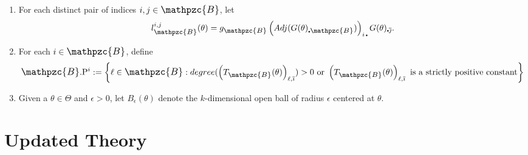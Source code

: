 \documentclass[11pt]{article}
\newcommand{\bul}{\scalebox{.45}{\ensuremath{\bullet}}}
\newcommand{\B}{\mathbin{\ThisStyle{\scalebox{1.15}{$\SavedStyle\ensuremath{\mathpzc{B}}$}}}}
\newcommand\thickbar[1]{\accentset{\rule{.4em}{.8pt}}{#1}}
\newcommand{\jcomp}{\thickbar{{\large \vphantom{a}} \jmath}}
\newcommand{\paramspace}{\Theta}
\newcommand{\g}[1]{g_{#1}}
\newcommand{\tableauEl}[4]{\left(T_{#1}(#2)\right)_{#3,#4}}
\renewcommand{\P}{\mathrm{P}}
\newcommand{\nonnegCol}[2]{#1.\P^{#2}}
\renewcommand{\complement}[1]{\overline{#1}}
\renewcommand{\jcomp}{\complement{\jmath}}
\newcommand{\lhs}[4]{l_{#1}^{#2,#3}(#4)}
\newcommand{\ball}[2]{B_{#1}(#2)}
\begin{document}
\begin{enumerate}
\item For each distinct pair of indices $i,j \in \B$, let 
\begin{equation}\label{lhs}
\lhs{\B}{i}{j}{\theta} = \g{\B}\left(Adj(G(\theta)_{\bul \B})\right)_{i\, \bul}G(\theta)_{\bul \jcomp}.
\end{equation}

\item For each $i \in \B$, define 
\begin{equation}\label{nonnegCol}
\nonnegCol{\B}{i} := \left\{\ell \in \B: degree(\tableauEl{\B}{\theta}{\ell}{\complement{\imath}}) > 0 \text{ or } \tableauEl{\B}{\theta}{\ell}{\complement{\imath}} \text{ is a strictly positive constant} \right\}
\end{equation}

\item Given a $\theta \in \paramspace$ and $\epsilon > 0$, let $\ball{\epsilon}{\theta}$ denote the $k$-dimensional open ball of radius $\epsilon$ centered at $\theta$.

\end{enumerate}

\section{Updated Theory}
\end{document}
